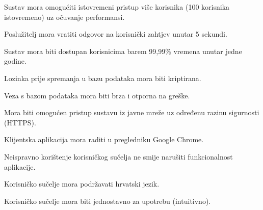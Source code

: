 			 \begin{packed_item}
			 	\item Sustav mora omogućiti istovremeni pristup više korisnika (100 korisnika istovremeno) uz očuvanje performansi.
			 	\item Poslužitelj mora vratiti odgovor na korisnički zahtjev unutar 5 sekundi.
			 	\item Sustav mora biti dostupan korisnicima barem 99,99\% vremena unutar jedne godine.
			 	\item Lozinka prije spremanja u bazu podataka mora biti kriptirana.
			 	\item Veza s bazom podataka mora biti brza i otporna na greške.
			 	\item Mora biti omogućen pristup sustavu iz javne mreže uz određenu razinu sigurnosti (HTTPS).
			 	\item Klijentska aplikacija mora raditi u pregledniku Google Chrome.
			 	\item Neispravno korištenje korisničkog sučelja ne smije narušiti funkcionalnost aplikacije.
			 	\item Korisničko sučelje mora podržavati hrvatski jezik.
			 	\item Korisničko sučelje mora biti jednostavno za upotrebu (intuitivno).
			 \end{packed_item}
			 
			 
			 
	